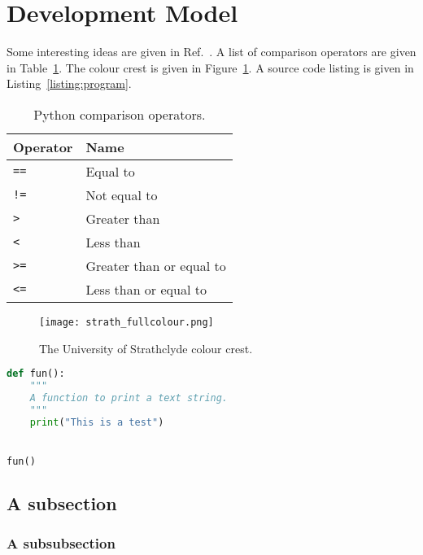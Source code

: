 \section{Development Model}
Some interesting ideas are given in Ref.~\cite{turing1950computing}.  A list of comparison operators are given in Table~\ref{table:comparison-operators}.  The colour crest is given in Figure~\ref{figure:colour-crest}.  A source code listing is given in Listing~\ref{listing:program}.

\begin{table}[h!!]
  \begin{center}
    \caption{Python comparison operators.}
    \label{table:comparison-operators}
    \begin{tabular}{l|l} \hline
      \textbf{Operator} & \textbf{Name}\\
      \hline
      \texttt{==} & Equal to\\
      \texttt{!=} & Not equal to\\
      \texttt{>} & Greater than\\
      \texttt{<} & Less than\\
      \texttt{>=} & Greater than or equal to\\
      \texttt{<=} & Less than or equal to\\ \hline
    \end{tabular}
  \end{center}
\end{table}

\begin{figure}[h!!]
  \begin{center}
    \texttt{[image: strath\_fullcolour.png]}
    \caption{The University of Strathclyde colour crest.}
    \label{figure:colour-crest}
  \end{center}
\end{figure}

\begin{singlespacing}
\begin{lstlisting}[language=python,caption={Demonstrating source code listing.},label=listing:program]
def fun():
    """
    A function to print a text string.
    """
    print("This is a test")


fun()
\end{lstlisting}
\end{singlespacing}

\lipsum[1-2]
\subsection{A subsection}
\lipsum[1-2]
\subsubsection{A subsubsection}
\lipsum[1-2]